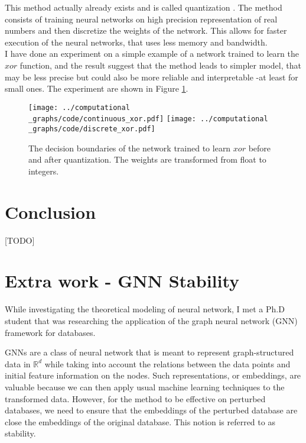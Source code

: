 \documentclass[11pt,a4paper]{article}
\newcommand{\bb}[1]{\mathbb{#1}}
\newcommand{\R}{\bb{R}}
\theoremstyle{definition}
\begin{document}
	This method actually already exists and is called quantization . The method consists of training neural networks on high precision representation of real numbers and then discretize the weights of the network. This allows for faster execution of the neural networks, that uses less memory and bandwidth.\\
	
	I have done an experiment on a simple example of a network trained to learn the $xor$ function, and the result suggest that the method leads to simpler model, that may be less precise but could also be more reliable and interpretable -at least for small ones. The experiment are shown in Figure \ref{fig:xor_example}.
	
	\begin{figure}
	\centering
	\texttt{[image: ../computational\\\_graphs/code/continuous\_xor.pdf]}
\texttt{[image: ../computational\\\_graphs/code/discrete\_xor.pdf]}
	\caption{The decision boundaries of the network trained to learn $xor$ before and after quantization. The weights are transformed from float to integers.}
	\label{fig:xor_example}
	\end{figure}
	
\section{Conclusion}

	[TODO]
	
	
\section{Extra work - GNN Stability}
	While investigating the theoretical modeling of neural network, I met a Ph.D student that was researching the application of the graph neural network (GNN) framework for databases.
	
	GNNs are a class of neural network that is meant to represent graph-structured data in $\R^d$ while taking into account the relations between the data points and initial feature information on the nodes. Such representations, or embeddings, are valuable because we can then apply usual machine learning techniques to the transformed data. However, for the method to be effective on perturbed databases, we need to ensure that the embeddings of the perturbed database are close the embeddings of the original database. This notion is referred to as stability. 
	
\end{document}
